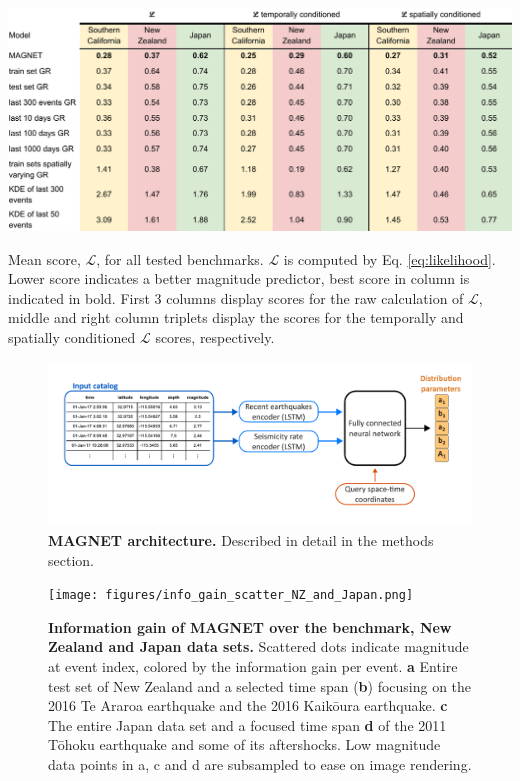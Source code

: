 \documentclass[pdflatex]{sn-jnl}
\begin{document}
\newpage
\begin{table}[h!]
    \centering
    \includegraphics[width=1\textwidth]{figures/em_table.pdf}
    \caption{Mean score, $\mathcal{L}$, for all tested benchmarks. $\mathcal{L}$ is computed by Eq. \ref{eq:likelihood}. Lower score indicates a better magnitude predictor, best score in column is indicated in bold. First 3 columns display scores for the raw calculation of $\mathcal{L}$, middle and right column triplets display the scores for the temporally and spatially conditioned $\mathcal{L}$ scores, respectively.
    }
    \label{tab:mean_ll_all_benchmarks}
\end{table}



\newpage
\begin{figure}[h!]
    \centering
    \includegraphics[width=1\textwidth]{figures/detailed_architecture.pdf}
    \caption{\textbf{MAGNET architecture.} Described in detail in the methods section.}
    \label{fig:architecture}
\end{figure}

\newpage
\begin{figure}[h!]
	\centering
        \texttt{[image: figures/info\_gain\_scatter\_NZ\_and\_Japan.png]}
	\caption{
            \textbf{Information gain of MAGNET over the benchmark, New Zealand and Japan data sets.} Scattered dots indicate magnitude at event index, colored by the information gain per event. \textbf{a} Entire test set of New Zealand and a selected time span (\textbf{b}) focusing on the 2016 Te Araroa earthquake and the 2016 Kaikōura earthquake. \textbf{c} The entire Japan data set and a focused time span \textbf{d} of the 2011 Tōhoku earthquake and some of its aftershocks. Low magnitude data points in a, c and d are subsampled to ease on image rendering.
         }
\label{fig:nz_japan_info_gain}
\end{figure}
\end{document}
